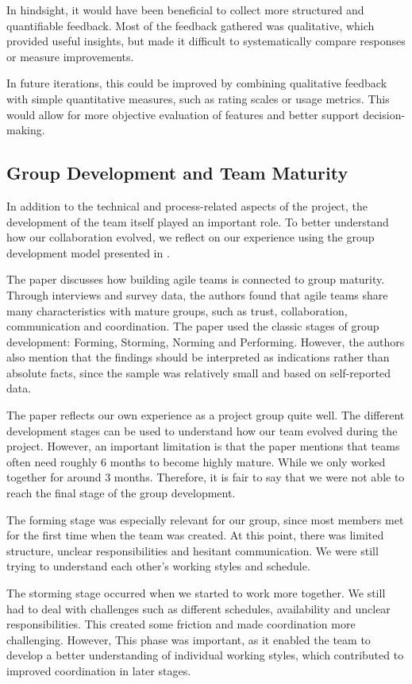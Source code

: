 In hindsight, it would have been beneficial to collect more structured and quantifiable feedback.
Most of the feedback gathered was qualitative, which provided useful insights,
but made it difficult to systematically compare responses or measure improvements.

In future iterations, this could be improved by combining qualitative feedback
with simple quantitative measures, such as rating scales or usage metrics.
This would allow for more objective evaluation of features and better support decision-making.

\subsection{Group Development and Team Maturity}

In addition to the technical and process-related aspects of the project,
the development of the team itself played an important role.
To better understand how our collaboration evolved,
we reflect on our experience using the group development model presented in \cite{Group_development}.

The paper discusses how building agile teams is connected to group maturity.
Through interviews and survey data, the authors found that agile teams share many
characteristics with mature groups, such as trust, collaboration, communication and coordination.
The paper used the classic stages of group development: Forming, Storming, Norming and Performing.
However, the authors also mention that the findings should be interpreted as indications rather
than absolute facts, since the sample was relatively small and based on self-reported data.

The paper reflects our own experience as a project group quite well.
The different development stages can be used to understand how our team evolved during the project.
However, an important limitation is that the paper mentions that teams often need
roughly 6 months to become highly mature.
While we only worked together for around 3 months.
Therefore, it is fair to say that we were not able to reach the final stage of the group development.

The forming stage was especially relevant for our group,
since most members met for the first time when the team was created.
At this point, there was limited structure, unclear responsibilities and hesitant communication.
We were still trying to understand each other’s working styles and schedule.

The storming stage occurred when we started to work more together.
We still had to deal with challenges such as different schedules,
availability and unclear responsibilities.
This created some friction and made coordination more challenging.
However, This phase was important, as it enabled the team to develop a better understanding of individual working styles,
which contributed to improved coordination in later stages.

